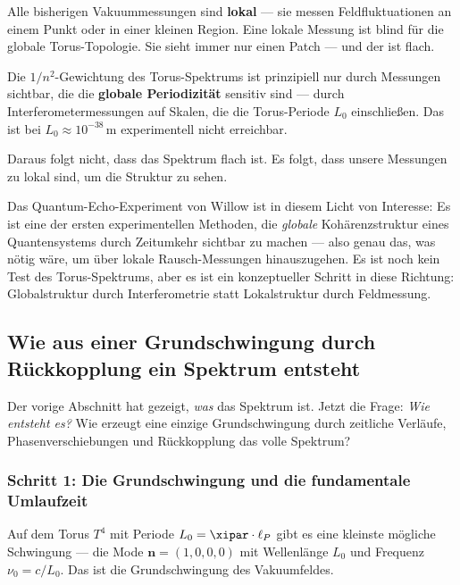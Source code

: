 \begin{conclusionBox}
Alle bisherigen Vakuummessungen sind \textbf{lokal} — sie messen Feldfluktuationen
an einem Punkt oder in einer kleinen Region. Eine lokale Messung ist blind für die
globale Torus-Topologie. Sie sieht immer nur einen Patch — und der ist flach.

Die $1/n^2$-Gewichtung des Torus-Spektrums ist prinzipiell nur durch Messungen
sichtbar, die die \textbf{globale Periodizität} sensitiv sind — durch
Interferometermessungen auf Skalen, die die Torus-Periode $L_0$ einschließen.
Das ist bei $L_0 \approx 10^{-38}$\,m experimentell nicht erreichbar.

Daraus folgt nicht, dass das Spektrum flach ist. Es folgt, dass unsere
Messungen zu lokal sind, um die Struktur zu sehen.
\end{conclusionBox}

Das Quantum-Echo-Experiment von Willow ist in diesem Licht von Interesse: Es ist
eine der ersten experimentellen Methoden, die \emph{globale} Kohärenzstruktur eines
Quantensystems durch Zeitumkehr sichtbar zu machen — also genau das, was nötig wäre,
um über lokale Rausch-Messungen hinauszugehen. Es ist noch kein Test des
Torus-Spektrums, aber es ist ein konzeptueller Schritt in diese Richtung:
Globalstruktur durch Interferometrie statt Lokalstruktur durch Feldmessung.

\subsection{Wie aus einer Grundschwingung durch Rückkopplung ein Spektrum entsteht}

Der vorige Abschnitt hat gezeigt, \emph{was} das Spektrum ist. Jetzt die Frage:
\emph{Wie entsteht es?} Wie erzeugt eine einzige Grundschwingung durch zeitliche
Verläufe, Phasenverschiebungen und Rückkopplung das volle Spektrum?

\subsubsection*{Schritt 1: Die Grundschwingung und die fundamentale Umlaufzeit}

Auf dem Torus $T^4$ mit Periode $L_0 = \xipar \cdot \ell_P$ gibt es eine
kleinste mögliche Schwingung — die Mode $\mathbf{n} = (1,0,0,0)$ mit
Wellenlänge $L_0$ und Frequenz $\nu_0 = c/L_0$. Das ist die Grundschwingung
des Vakuumfeldes.

